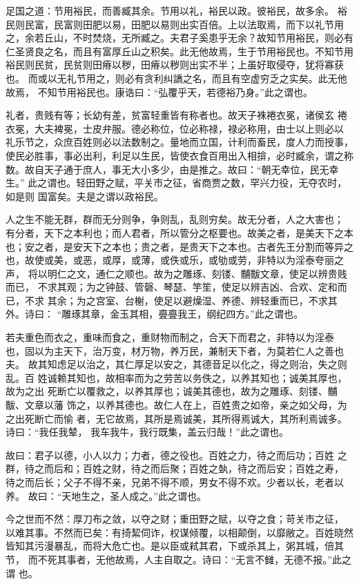 \documentclass[]{article}
\begin{document}
足国之道：节用裕民，而善臧其余。节用以礼，裕民以政。彼裕民，故多余。
裕民则民富，民富则田肥以易，田肥以易则出实百倍。上以法取焉，而下以礼节用
之，余若丘山，不时焚烧，无所臧之。夫君子奚患乎无余？故知节用裕民，则必有
仁圣贤良之名，而且有富厚丘山之积矣。此无他故焉，生于节用裕民也。不知节用
裕民则民贫，民贫则田瘠以秽，田瘠以秽则出实不半；上虽好取侵夺，犹将寡获也。
而或以无礼节用之，则必有贪利纠譑之名，而且有空虚穷乏之实矣。此无他故焉，
不知节用裕民也。康诰曰：``弘覆乎天，若德裕乃身。''此之谓也。

礼者，贵贱有等；长幼有差，贫富轻重皆有称者也。故天子袾裷衣冕，诸侯玄
裷衣冕，大夫裨冕，士皮弁服。德必称位，位必称禄，禄必称用，由士以上则必以
礼乐节之，众庶百姓则必以法数制之。量地而立国，计利而畜民，度人力而授事，
使民必胜事，事必出利，利足以生民，皆使衣食百用出入相揜，必时臧余，谓之称
数。故自天子通于庶人，事无大小多少，由是推之。故曰：``朝无幸位，民无幸生。''
此之谓也。轻田野之赋，平关市之征，省商贾之数，罕兴力役，无夺农时，如是则
国富矣。夫是之谓以政裕民。

人之生不能无群，群而无分则争，争则乱，乱则穷矣。故无分者，人之大害也；
有分者，天下之本利也；而人君者，所以管分之枢要也。故美之者，是美天下之本
也；安之者，是安天下之本也；贵之者，是贵天下之本也。古者先王分割而等异之
也，故使或美，或恶，或厚，或薄，或佚或乐，或劬或劳，非特以为淫泰夸丽之声，
将以明仁之文，通仁之顺也。故为之雕琢、刻镂、黼黻文章，使足以辨贵贱而已，
不求其观；为之钟鼓、管磬、琴瑟、竽笙，使足以辨吉凶、合欢、定和而已，不求
其余；为之宫室、台榭，使足以避燥湿、养德、辨轻重而已，不求其外。诗曰：
``雕琢其章，金玉其相，亹亹我王，纲纪四方。''此之谓也。

若夫重色而衣之，重味而食之，重财物而制之，合天下而君之，非特以为淫泰
也，固以为主天下，治万变，材万物，养万民，兼制天下者，为莫若仁人之善也夫。
故其知虑足以治之，其仁厚足以安之，其德音足以化之，得之则治，失之则乱。百
姓诚赖其知也，故相率而为之劳苦以务佚之，以养其知也；诚美其厚也，故为之出
死断亡以覆救之，以养其厚也；诚美其德也，故为之雕琢、刻镂、黼黻、文章以藩
饰之，以养其德也。故仁人在上，百姓贵之如帝，亲之如父母，为之出死断亡而愉
者，无它故焉，其所是焉诚美，其所得焉诚大，其所利焉诚多。诗曰：``我任我辇，
我车我牛，我行既集，盖云归哉！''此之谓也。

故曰：君子以德，小人以力；力者，德之役也。百姓之力，待之而后功；百姓
之群，待之而后和；百姓之财，待之而后聚；百姓之埶，待之而后安；百姓之寿，
待之而后长；父子不得不亲，兄弟不得不顺，男女不得不欢。少者以长，老者以养。
故曰：``天地生之，圣人成之。''此之谓也。

今之世而不然：厚刀布之敛，以夺之财；重田野之赋，以夺之食；苛关市之征，
以难其事。不然而已矣：有掎絜伺诈，权谋倾覆，以相颠倒，以靡敝之。百姓晓然
皆知其污漫暴乱，而将大危亡也。是以臣或弒其君，下或杀其上，粥其城，倍其节，
而不死其事者，无他故焉，人主自取之。诗曰：``无言不雠，无德不报。''此之谓
也。
\end{document}
